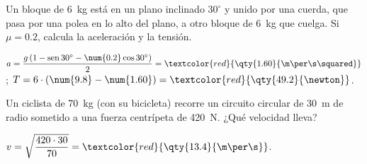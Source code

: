 \begin{exercise}
    Un bloque de \qty{6}{\kg} está en un plano inclinado \(30^\circ\) y unido por una cuerda, que pasa por una polea en lo alto del plano,
    a otro bloque de \qty{6}{\kg} que cuelga. Si \(\mu = \num{0.2}\), calcula la aceleración y la tensión.
    \begin{solu}
        \(a = \dfrac{g\,(1 - \sen 30^\circ - \num{0.2}\cos 30^\circ)}{2} = \textcolor{red}{\qty{1.60}{\m\per\s\squared}}\);
        \(T = 6 \cdot (\num{9.8} - \num{1.60}) = \textcolor{red}{\qty{49.2}{\newton}}\).
    \end{solu}
\end{exercise}

\begin{exercise}
    Un ciclista de \qty{70}{\kg} (con su bicicleta) recorre un circuito circular de \qty{30}{\m} de radio sometido a una fuerza centrípeta
    de \qty{420}{\newton}. ¿Qué velocidad lleva?
    \begin{solu}
        \(v = \sqrt{\dfrac{420 \cdot 30}{70}} = \textcolor{red}{\qty{13.4}{\m\per\s}}\).
    \end{solu}
\end{exercise}
